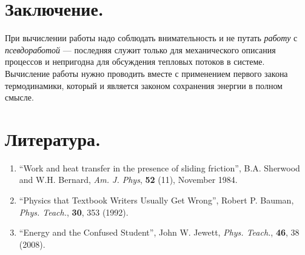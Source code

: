 \documentclass[a4paper,12pt]{article}
\newlength{\h}
\newlength{\x}
\begin{document}
\section{Заключение.}
\label{sec:summary}

При вычислении работы надо соблюдать внимательность и не путать
\textit{работу} с \textit{псевдоработой} --- последняя служит только
для механического описания процессов и непригодна для обсуждения
тепловых потоков в системе. Вычисление работы нужно проводить вместе с
применением первого закона термодинамики, который и является законом
сохранения энергии в полном смысле.

\section{Литература.}
\label{sec:ref}

\begin{enumerate}
\item ``Work and heat transfer in the presence of sliding
    friction'', B.A. Sherwood and W.H. Bernard, \textit{Am. J. Phys},
  \textbf{52} (11), November 1984.
\item ``Physics that Textbook Writers Usually Get Wrong'', Robert
  P. Bauman, \textit{Phys. Teach.}, \textbf{30}, 353 (1992).
\item ``Energy and the Confused Student'', John W. Jewett,
  \textit{Phys. Teach.}, \textbf{46}, 38 (2008).
\end{enumerate}
\end{document}
